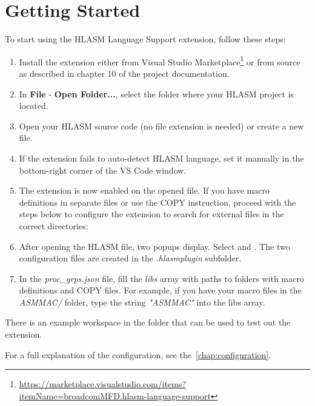 \chapter{Getting Started}

To start using the HLASM Language Support extension, follow these steps:

\begin{enumerate}
	\item Install the extension either from Visual Studio Marketplace\footnote{\url{https://marketplace.visualstudio.com/items?itemName=broadcomMFD.hlasm-language-support}} or from source as described in chapter 10 of the project documentation.
	\item In \textbf{File} - \textbf{Open Folder...}, select the folder where your HLASM project is located.
	\item Open your HLASM source code (no file extension is needed) or create a new file.
	\item If the extension fails to auto-detect HLASM language, set it manually in the bottom-right corner of the VS Code window.  
	\item The extension is now enabled on the opened file. If you have macro definitions in separate files or use the COPY instruction, proceed with the steps below to configure the extension to search for external files in the correct directories:
	\item After opening the HLASM file, two popups display. Select  and . The two configuration files are created in the \emph{.hlasmplugin} subfolder.
	\item In the \emph{proc\_grps.json} file, fill the \emph{libs} array with paths to folders with macro definitions and COPY files. For example, if you have your macro files in the \emph{ASMMAC/} folder, type the string \emph{"ASMMAC"} into the libs array.
\end{enumerate}

There is an example workspace in the folder  that can be used to test out the extension.

For a full explanation of the configuration, see the~\cref{chap:configuration}.
